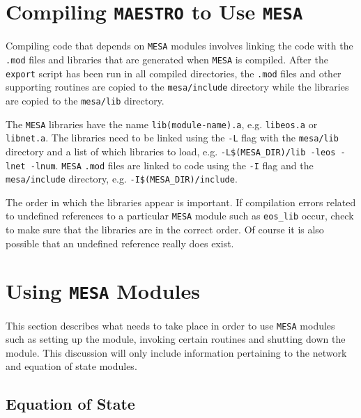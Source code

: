 \section{Compiling {\tt MAESTRO} to Use {\tt MESA}}

Compiling code that depends on {\tt MESA} modules involves linking the code 
with the {\tt .mod} files and libraries that are generated when {\tt MESA} 
is compiled. After the {\tt export} script has been run in all compiled 
directories, the {\tt .mod} files and other supporting routines are 
copied to the {\tt mesa/include} directory while the libraries are copied to 
the {\tt mesa/lib} directory.

The {\tt MESA} libraries have the name {\tt lib(module-name).a}, e.g. 
{\tt libeos.a} or {\tt libnet.a}. The libraries need to be linked using the 
{\tt -L} flag with the {\tt mesa/lib} directory and a list of which libraries 
to load, e.g. {\tt -L\$(MESA\_DIR)/lib -leos -lnet -lnum}. {\tt MESA} 
{\tt .mod} files are linked to code using the {\tt -I} flag and the 
{\tt mesa/include} directory, e.g. {\tt -I\$(MESA\_DIR)/include}.

The order in which the libraries appear is important. If compilation errors 
related to undefined references to a particular {\tt MESA} module such as 
{\tt eos\_lib} occur, check to make sure that the libraries are in the correct 
order. Of course it is also possible that an undefined reference really does 
exist.

\section{Using {\tt MESA} Modules}

This section describes what needs to take place in order to use 
{\tt MESA} modules such as setting up the module, invoking certain routines 
and shutting down the module. This discussion will only include information 
pertaining to the network and equation of state modules.

\subsection{Equation of State}

